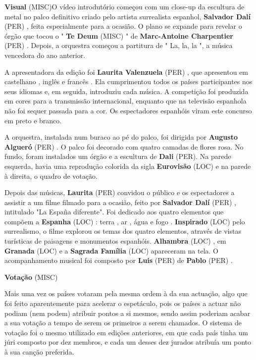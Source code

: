 \documentclass[12pt,a4paper]{article}
\begin{document}
\textbf{Visual} (MISC)O vídeo introdutório começou com um close-up da escultura de metal no palco definitivo criado pelo artista surrealista espanhol, \textbf{Salvador Dalí} (PER) , feita especialmente para a ocasião. O plano se expande para revelar o órgão que tocou o " \textbf{Te Deum} (MISC) " de \textbf{Marc-Antoine Charpentier} (PER) . Depois, a orquestra começou a partitura de " La, la, la ", a música vencedora do ano anterior.

A apresentadora da edição foi \textbf{Laurita Valenzuela} (PER) , que apresentou em castelhano , inglês e francês . Ela cumprimentou todos os países participantes nos seus idiomas e, em seguida, introduziu cada música. A competição foi produzida em cores para a transmissão internacional, enquanto que na televisão espanhola não foi sequer passada para a cor. Os espectadores espanhóis viram este concurso em preto e branco.

A orquestra, instalada num buraco ao pé do palco, foi dirigida por \textbf{Augusto Algueró} (PER) . O palco foi decorado com quatro camadas de flores rosa. No fundo, foram instalados um órgão e a escultura de \textbf{Dali} (PER). Na parede esquerda, havia uma reprodução colorida da sigla \textbf{Eurovisão} (LOC) e na parede à direita, o quadro de votação.

Depois das músicas, \textbf{Laurita} (PER) convidou o público e os espectadores a assistir a um filme filmado para a ocasião, feito por \textbf{Salvador Dalí} (PER) , intitulado "La España diferente". Foi dedicado aos quatro elementos que compõem a \textbf{Espanha} (LOC) : terra , ar , água e fogo . \textbf{Inspirado} (LOC) pelo surrealismo, o filme explorou os temas dos quatro elementos, através de vistas turísticas de paisagens e monumentos espanhóis. \textbf{Alhambra} (LOC) , em \textbf{Granada} (LOC) e a \textbf{Sagrada Família} (LOC) apareceram na tela. O acompanhamento musical foi composto por \textbf{Luis} (PER) de \textbf{Pablo} (PER) .



\textbf{Votação} (MISC)

Mais uma vez os países votaram pela mesma ordem à da sua actuação, algo que foi feito aparentemente para acelerar o espetáculo, pois os países a actuar não podiam (nem podem) atribuir pontos a si mesmos, sendo assim poderiam acabar a sua votação a tempo de serem os primeiros a serem chamados. O sistema de votação foi o mesmo utilizado em edições anteriores, em que cada país tinha um júri composto por dez membros, e cada um desses dez jurados atribuía um ponto à sua canção preferida.
\end{document}
